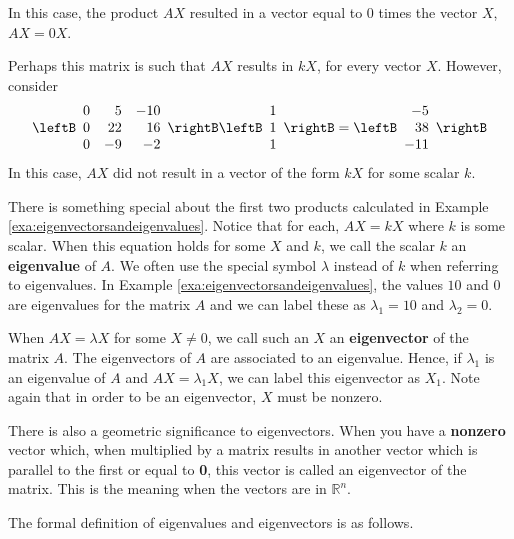 \begin{solution}
In this case, the product $AX$ resulted in a vector equal to $0$ times the vector $X$, $AX=0X$. 

Perhaps this matrix is such that $AX$ results in $kX$, for every vector $X$. However, consider
\begin{equation*}
\leftB
\begin{array}{rrr}
0 & 5 & -10 \\
0 & 22 & 16 \\
0 & -9 & -2
\end{array}
\rightB \leftB
\begin{array}{r}
1 \\
1 \\
1
\end{array}
\rightB = \leftB
\begin{array}{r}
-5 \\
38 \\
-11
\end{array}
\rightB 
\end{equation*}
In this case, $AX$ did not result in a vector of the form $kX$ for some scalar $k$. 
\end{solution}

There is something special about the first two products calculated in
Example \ref{exa:eigenvectorsandeigenvalues}.  Notice that for each,
$AX=kX$ where $k$ is some scalar.  When this equation holds for some
$X$ and $k$, we call the scalar $k$ an \textbf{eigenvalue} of $A$. We
often use the special symbol $\lambda$ instead of $k$ when referring
to eigenvalues. In Example \ref{exa:eigenvectorsandeigenvalues}, the
values $10$ and $0$ are eigenvalues for the matrix $A$ and we can
label these as $\lambda_1 = 10$ and $\lambda_2 = 0$.

When $AX = \lambda X$ for some $X \neq 0$, we call such an $X$ an
\textbf{eigenvector} of the matrix $A$. The eigenvectors of $A$ are
associated to an eigenvalue.  Hence, if $\lambda_1$ is an eigenvalue
of $A$ and $AX = \lambda_1 X$, we can label this eigenvector as
$X_1$. Note again that in order to be an eigenvector, $X$ must be
nonzero.

There is also a geometric significance to eigenvectors.  When you have a \textbf{nonzero} vector which, when multiplied by a matrix results in another vector
which is parallel to the first or equal to \textbf{0}, this vector is called
an eigenvector of the matrix. This is the meaning when the vectors are in 
$\mathbb{R}^{n}.$ 

The formal definition of eigenvalues and eigenvectors is as follows.

